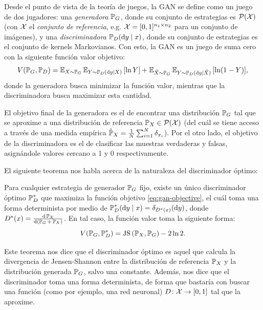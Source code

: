 {{Desde el punto de vista de la teoría de juegos, la GAN se define como un juego de dos jugadores: una \textit{generadora} $\Prob_G$, donde su conjunto de estrategias es $\ProbSpace[\cX]$ (con $\cX$ el \textit{conjunto de referencia}, e.g. $\cX=[0, 1]^{n_1\times n_2}$ para un conjunto de imágenes), y una \textit{discriminadora} $\Prob_D(\dd y \mid x)$, donde su conjunto de estrategias es el conjunto de kernels Markovianos. Con esto, la GAN es un juego de suma cero con la siguiente función valor objetivo:
\begin{equation}
    \label{eq:gan-objective}
    V(\Prob_G, \Prob_D)
    = \Exp_{X\sim\Prob_G}{\Exp_{Y \sim \Prob_D(\dd y \mid X)} \left[ \ln Y \right]}
    + \Exp_{\tilde X\sim\Prob_G}{\Exp_{Y \sim \Prob_D(\dd y \mid \tilde X)} \left[ \ln (1 - Y) \right]},
\end{equation}
donde la generadora busca minimizar la función valor, mientras que la discriminadora busca maximizar esta cantidad.

El objetivo final de la generadora es el de encontrar una distribución $\Prob_G$ tal que se aproxime a una distribución de referencia $\Prob_X \in \ProbSpace[\cX]$ (del cuál se tiene acceso a través de una medida empírica $\hat \Prob_X = \frac{1}{N} \sum_{i=1}^{N} \delta_{x_i}$). Por el otro lado, el objetivo de la discriminadora es el de clasificar las muestras verdaderas y falsas, asignándole valores cercano a 1 y 0 respectivamente.

El siguiente teorema nos habla acerca de la naturaleza del discriminador óptimo:

\begin{theorem}
    \label{thm:gan-optimal-discriminator}
    Para cualquier estrategia de generador $\Prob_G$ fijo, existe un único discriminador óptimo $\Prob_D^\ast$ que maximiza la función objetivo \eqref{eq:gan-objective}, el cuál toma una forma determinista por medio de $\Prob_D^\ast(\dd y \mid x) = \delta_{D^\ast(x)}(\dd y)$, donde $D^\ast(x) = \dv{\Prob_X}{(\Prob_G+\Prob_X)}$. En tal caso, la función valor toma la siguiente forma:
    \begin{equation}
        V(\Prob_G, \Prob_D^\ast) = \JS{\Prob_X}{\Prob_G} - 2 \ln 2.
    \end{equation}
\end{theorem}

Este teorema nos dice que el discriminador óptimo es aquel que calcula la divergencia de Jensen-Shannon entre la distribución de referencia $\Prob_X$ y la distribución generada $\Prob_G$, salvo una constante. Además, nos dice que el discriminador toma una forma determinista, de forma que bastaría con buscar una función (como por ejemplo, una red neuronal) $D\colon\cX\to [0, 1]$ tal que la aproxime.

}}
